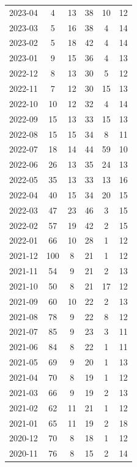 \documentclass[12pt]{report}
\begin{document}
\begin{longtable}{|c|c|c|c|c|c|}
            2023-04 & 4 & 13 & 38 & 10 & 12 \\
            2023-03 & 5 & 16 & 38 & 4 & 14 \\
            2023-02 & 5 & 18 & 42 & 4 & 14 \\
            2023-01 & 9 & 15 & 36 & 4 & 13 \\
            2022-12 & 8 & 13 & 30 & 5 & 12 \\
            2022-11 & 7 & 12 & 30 & 15 & 13 \\
            2022-10 & 10 & 12 & 32 & 4 & 14 \\
            2022-09 & 15 & 13 & 33 & 15 & 13 \\
            2022-08 & 15 & 15 & 34 & 8 & 11 \\
            2022-07 & 18 & 14 & 44 & 59 & 10 \\
            2022-06 & 26 & 13 & 35 & 24 & 13 \\
            2022-05 & 35 & 13 & 33 & 13 & 16 \\
            2022-04 & 40 & 15 & 34 & 20 & 15 \\
            2022-03 & 47 & 23 & 46 & 3 & 15 \\
            2022-02 & 57 & 19 & 42 & 2 & 15 \\
            2022-01 & 66 & 10 & 28 & 1 & 12 \\
            2021-12 & 100 & 8 & 21 & 1 & 12 \\
            2021-11 & 54 & 9 & 21 & 2 & 13 \\
            2021-10 & 50 & 8 & 21 & 17 & 12 \\
            2021-09 & 60 & 10 & 22 & 2 & 13 \\
            2021-08 & 78 & 9 & 22 & 8 & 12 \\
            2021-07 & 85 & 9 & 23 & 3 & 11 \\
            2021-06 & 84 & 8 & 22 & 1 & 11 \\
            2021-05 & 69 & 9 & 20 & 1 & 13 \\
            2021-04 & 70 & 8 & 19 & 1 & 12 \\
            2021-03 & 66 & 9 & 19 & 2 & 13 \\
            2021-02 & 62 & 11 & 21 & 1 & 12 \\
            2021-01 & 65 & 11 & 19 & 2 & 18 \\
            2020-12 & 70 & 8 & 18 & 1 & 12 \\
            2020-11 & 76 & 8 & 15 & 2 & 14 \\

\end{longtable}
\end{document}
